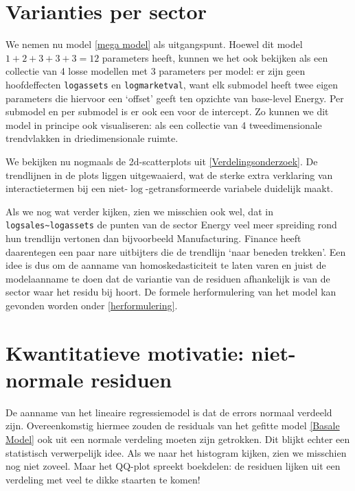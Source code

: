 \documentclass[a4paper]{report}
\begin{document}
\section{Varianties per sector}
 
  We nemen nu model \ref{mega model} als uitgangspunt. Hoewel dit model $1+2+3+3+3 = 12$ parameters heeft, kunnen we het ook bekijken als een collectie van 4 losse modellen met 3 parameters per model: er zijn geen hoofdeffecten \verb!logassets! en \verb!logmarketval!, want elk submodel heeft twee eigen parameters die hiervoor een `offset' geeft ten opzichte van base-level Energy. Per submodel en per submodel is er ook een voor de intercept. Zo kunnen we dit model in principe ook visualiseren: als een collectie van 4 tweedimensionale trendvlakken in driedimensionale ruimte.

  We bekijken nu nogmaals de 2d-scatterplots uit \ref{Verdelingsonderzoek}. De trendlijnen in de plots liggen uitgewaaierd, wat de sterke extra verklaring van interactietermen bij een niet-$\log$-getransformeerde variabele duidelijk maakt.
  
  Als we nog wat verder kijken, zien we misschien ook wel, dat in \verb!logsales~logassets! de punten van de sector Energy veel meer spreiding rond hun trendlijn vertonen dan bijvoorbeeld Manufacturing. Finance heeft daarentegen een paar nare uitbijters die de trendlijn `naar beneden trekken'. Een idee is dus om de aanname van homoskedasticiteit te laten varen en juist de modelaanname te doen dat de variantie van de residuen afhankelijk is van de sector waar het residu bij hoort. De formele herformulering van het model kan gevonden worden onder \ref{herformulering}.
  
\section{Kwantitatieve motivatie: niet-normale residuen}
  De aanname van het lineaire regressiemodel is dat de errors normaal verdeeld zijn. Overeenkomstig hiermee zouden de residuals van het gefitte model \ref{Basale Model} ook uit een normale verdeling moeten zijn getrokken. Dit blijkt echter een statistisch verwerpelijk idee. Als we naar het histogram kijken, zien we misschien nog niet zoveel. Maar het  QQ-plot spreekt boekdelen: de residuen lijken uit een verdeling met veel te dikke staarten te komen!
  
\end{document}
